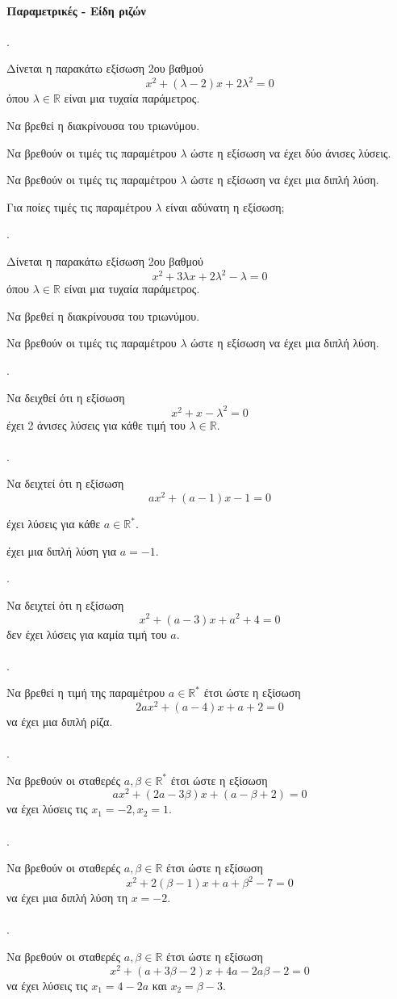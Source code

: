 \documentclass[11pt,a4paper,twocolumn]{article}
\newcounter{askhsh}
\newcommand{\askhsh}{{\large\theaskhsh.}\ \addtocounter{askhsh}{1}}
\begin{document}
\paragraph{Παραμετρικές - Είδη ριζών}
\askhsh
Δίνεται η παρακάτω εξίσωση 2{ου} βαθμού
\[ x^2+(\lambda-2) x+2\lambda^2=0 \]
όπου $ \lambda\in\mathbb{R} $ είναι μια τυχαία παράμετρος.
\begin{alist}
\item Να βρεθεί η διακρίνουσα του τριωνύμου.
\item Να βρεθούν οι τιμές τις παραμέτρου $ \lambda $ ώστε η εξίσωση να έχει δύο άνισες λύσεις.
\item Να βρεθούν οι τιμές τις παραμέτρου $ \lambda $ ώστε η εξίσωση να έχει μια διπλή λύση.
\item Για ποίες τιμές τις παραμέτρου $ \lambda $ είναι αδύνατη η εξίσωση;
\end{alist}
\askhsh Δίνεται η παρακάτω εξίσωση 2{ου} βαθμού
\[ x^2+3\lambda x+2\lambda^2-\lambda=0 \]
όπου $ \lambda\in\mathbb{R} $ είναι μια τυχαία παράμετρος.
\begin{alist}
\item Να βρεθεί η διακρίνουσα του τριωνύμου.
\item Να βρεθούν οι τιμές τις παραμέτρου $ \lambda $ ώστε η εξίσωση να έχει μια διπλή λύση.
\end{alist}
\askhsh
Να δειχθεί ότι η εξίσωση
\[ x^2+x-\lambda^2=0 \]
έχει 2 άνισες λύσεις για κάθε τιμή του $ \lambda\in\mathbb{R} $.\\\\
\askhsh
Να δειχτεί ότι η εξίσωση
\[ ax^2+(a-1)x-1=0 \]
\begin{alist}
\item έχει λύσεις για κάθε $ a\in\mathbb{R}^* $.
\item έχει μια διπλή λύση για $ a=-1 $.
\end{alist}
\askhsh
Να δειχτεί ότι η εξίσωση
\[ x^2+(a-3) x+a^2+4=0 \]
δεν έχει λύσεις για καμία τιμή του $ a $.\\\\
\askhsh
Να βρεθεί η τιμή της παραμέτρου $ a\in\mathbb{R}^* $ έτσι ώστε η εξίσωση
\[ 2ax^2+(a-4)x+a+2=0 \]
να έχει μια διπλή ρίζα.\\\\
\askhsh
Να βρεθούν οι σταθερές $ a,\beta\in\mathbb{R}^* $ έτσι ώστε η εξίσωση
\[ ax^2+(2a-3\beta)x+(a-\beta+2)=0 \] 
να έχει λύσεις τις $ x_1=-2, x_2=1 $.\\\\
\askhsh
Να βρεθούν οι σταθερές $ a, \beta\in\mathbb{R} $ έτσι ώστε η εξίσωση
 \[ x^2+2(\beta-1)x+a+\beta^2-7=0 \] 
 να έχει μια διπλή λύση τη $ x=-2$.\\\\
\askhsh
Να βρεθούν οι σταθερές $ a, \beta\in\mathbb{R} $ έτσι ώστε η εξίσωση
 \[ x^2+(a+3\beta-2)x+4a-2a\beta-2=0 \]
να έχει λύσεις τις $ x_1=4-2a $ και $ x_2=\beta-3 $.\\\\
\end{document}
